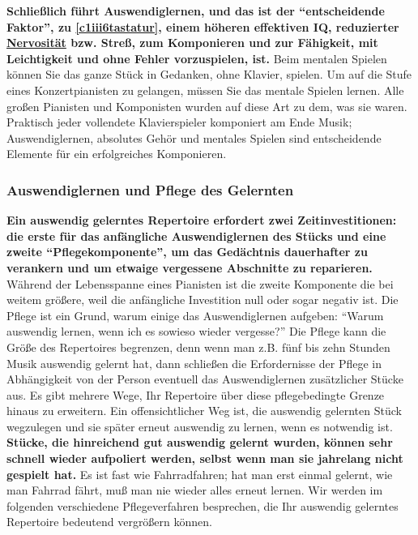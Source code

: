 \textbf{Schließlich führt Auswendiglernen, und das ist der \enquote{entscheidende Faktor}, zu \hyperref[c1iii6tastatur]{\autoref{c1iii6tastatur}}, einem höheren effektiven IQ, reduzierter \hyperref[c1iii15]{Nervosität} bzw. Streß, zum Komponieren und zur Fähigkeit, mit Leichtigkeit und ohne Fehler vorzuspielen, ist.}
Beim mentalen Spielen können Sie das ganze Stück in Gedanken, ohne Klavier, spielen.
Um auf die Stufe eines Konzertpianisten zu gelangen, müssen Sie das mentale Spielen lernen.
Alle großen Pianisten und Komponisten wurden auf diese Art zu dem, was sie waren.
Praktisch jeder vollendete Klavierspieler komponiert am Ende Musik; Auswendiglernen, absolutes Gehör und mentales Spielen sind entscheidende Elemente für ein erfolgreiches Komponieren.


\subsubsection{Auswendiglernen und Pflege des Gelernten}
\label{c1iii6c}

\textbf{Ein auswendig gelerntes Repertoire erfordert zwei Zeitinvestitionen: die erste für das anfängliche Auswendiglernen des Stücks und eine zweite \enquote{Pflegekomponente}, um das Gedächtnis dauerhafter zu verankern und um etwaige vergessene Abschnitte zu reparieren.}
Während der Lebensspanne eines Pianisten ist die zweite Komponente die bei weitem größere, weil die anfängliche Investition null oder sogar negativ ist.
Die Pflege ist ein Grund, warum einige das Auswendiglernen aufgeben: \enquote{Warum auswendig lernen, wenn ich es sowieso wieder vergesse?}
Die Pflege kann die Größe des Repertoires begrenzen, denn wenn man z.B. fünf bis zehn Stunden Musik auswendig gelernt hat, dann schließen die Erfordernisse der Pflege in Abhängigkeit von der Person eventuell das Auswendiglernen zusätzlicher Stücke aus.
Es gibt mehrere Wege, Ihr Repertoire über diese pflegebedingte Grenze hinaus zu erweitern.
Ein offensichtlicher Weg ist, die auswendig gelernten Stück wegzulegen und sie später erneut auswendig zu lernen, wenn es notwendig ist.
\textbf{Stücke, die hinreichend gut auswendig gelernt wurden, können sehr schnell wieder aufpoliert werden, selbst wenn man sie jahrelang nicht gespielt hat.}
Es ist fast wie Fahrradfahren; hat man erst einmal gelernt, wie man Fahrrad fährt, muß man nie wieder alles erneut lernen.
Wir werden im folgenden verschiedene Pflegeverfahren besprechen, die Ihr auswendig gelerntes Repertoire bedeutend vergrößern können. 

